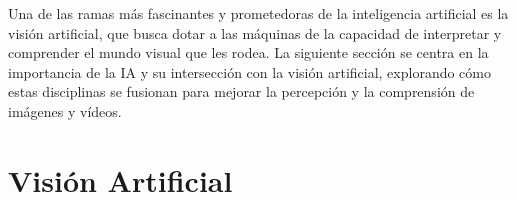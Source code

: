 



Una de las ramas más fascinantes y prometedoras de la inteligencia artificial es la visión artificial, que busca dotar a las máquinas de la capacidad de interpretar y comprender el mundo visual que les rodea. La siguiente sección se centra en la importancia de la IA y su intersección con la visión artificial, explorando cómo estas disciplinas se fusionan para mejorar la percepción y la comprensión de imágenes y vídeos.

\section{Visión Artificial}
\label{sec:VA} 

